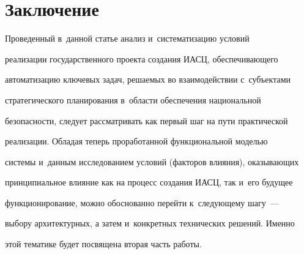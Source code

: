 \section{Заключение}


     


     Проведенный в~данной статье анализ и~систематизацию условий 


реализации государственного проекта создания ИАСЦ, обеспечивающего 


автоматизацию ключевых задач, решаемых во взаимодействии с~субъектами 


стратегического планирования в~области обеспечения национальной 


безопасности, следует рассматривать как первый шаг на пути практической 


реализации. Обладая теперь проработанной функциональной моделью 


системы и~данным исследованием условий (факторов влияния), оказывающих 


принципиальное влияние как на процесс создания ИАСЦ, так и~его будущее 


функционирование, можно обоснованно перейти к~следующему шагу~--- 


выбору архитектурных, а затем и~конкретных технических решений. Именно 


этой тематике будет посвящена вторая часть работы.


     


